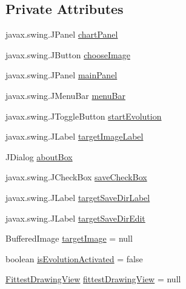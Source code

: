 \subsection*{Private Attributes}
\begin{DoxyCompactItemize}
\item 
javax.\-swing.\-J\-Panel \hyperlink{classexamples_1_1gp_1_1monalisa_1_1gui_1_1_genetic_drawing_view_abebee5fc36d5edc0a4528d0a3a6a3809}{chart\-Panel}
\item 
javax.\-swing.\-J\-Button \hyperlink{classexamples_1_1gp_1_1monalisa_1_1gui_1_1_genetic_drawing_view_aa85940d38039230df5f2fa874777cd5e}{choose\-Image}
\item 
javax.\-swing.\-J\-Panel \hyperlink{classexamples_1_1gp_1_1monalisa_1_1gui_1_1_genetic_drawing_view_a801c8b48e27e1bffb7f6afe7cce6b869}{main\-Panel}
\item 
javax.\-swing.\-J\-Menu\-Bar \hyperlink{classexamples_1_1gp_1_1monalisa_1_1gui_1_1_genetic_drawing_view_aa4693a74c3b7af1f57f4cfbe88f4f9b0}{menu\-Bar}
\item 
javax.\-swing.\-J\-Toggle\-Button \hyperlink{classexamples_1_1gp_1_1monalisa_1_1gui_1_1_genetic_drawing_view_a16ebb79b30bb7b61ea6b2356363acc77}{start\-Evolution}
\item 
javax.\-swing.\-J\-Label \hyperlink{classexamples_1_1gp_1_1monalisa_1_1gui_1_1_genetic_drawing_view_a4c295f7e484fb3f5c830c42e8dc34244}{target\-Image\-Label}
\item 
J\-Dialog \hyperlink{classexamples_1_1gp_1_1monalisa_1_1gui_1_1_genetic_drawing_view_a4c05c4f2fc677dcca404467750481167}{about\-Box}
\item 
javax.\-swing.\-J\-Check\-Box \hyperlink{classexamples_1_1gp_1_1monalisa_1_1gui_1_1_genetic_drawing_view_a8b2837e508c508a09e93805f90b57f91}{save\-Check\-Box}
\item 
javax.\-swing.\-J\-Label \hyperlink{classexamples_1_1gp_1_1monalisa_1_1gui_1_1_genetic_drawing_view_a44edf9b69a5bf1587dc553b9a3ac83a3}{target\-Save\-Dir\-Label}
\item 
javax.\-swing.\-J\-Label \hyperlink{classexamples_1_1gp_1_1monalisa_1_1gui_1_1_genetic_drawing_view_a3cae3769d4e005296805994ff5d40917}{target\-Save\-Dir\-Edit}
\item 
Buffered\-Image \hyperlink{classexamples_1_1gp_1_1monalisa_1_1gui_1_1_genetic_drawing_view_aa47764eab76c8f6cdbb0a5a4479f6ee0}{target\-Image} = null
\item 
boolean \hyperlink{classexamples_1_1gp_1_1monalisa_1_1gui_1_1_genetic_drawing_view_ae0317d758eb71db9e1758874790519fb}{is\-Evolution\-Activated} = false
\item 
\hyperlink{classexamples_1_1gp_1_1monalisa_1_1gui_1_1_fittest_drawing_view}{Fittest\-Drawing\-View} \hyperlink{classexamples_1_1gp_1_1monalisa_1_1gui_1_1_genetic_drawing_view_ac0e9a3db24cb6440790d5ae93af89283}{fittest\-Drawing\-View} = null
\end{DoxyCompactItemize}
